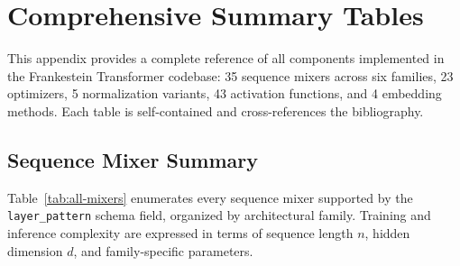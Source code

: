 \section{Comprehensive Summary Tables}
\label{sec:annex-summary-tables}

This appendix provides a complete reference of all components implemented in the Frankestein Transformer codebase: 35 sequence mixers across six families, 23 optimizers, 5 normalization variants, 43 activation functions, and 4 embedding methods. Each table is self-contained and cross-references the bibliography.

\subsection{Sequence Mixer Summary}

Table~\ref{tab:all-mixers} enumerates every sequence mixer supported by the \texttt{layer\_pattern} schema field, organized by architectural family. Training and inference complexity are expressed in terms of sequence length $n$, hidden dimension $d$, and family-specific parameters.

